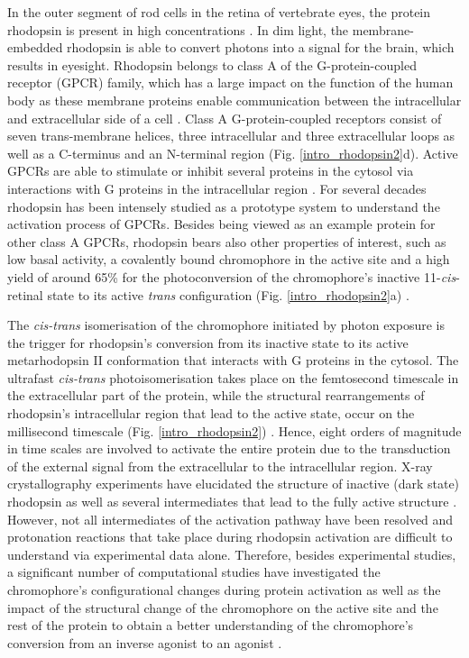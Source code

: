 \documentclass[journal=jacsat,manuscript=article]{achemso}
\begin{document}
In the outer segment of rod cells in the retina of vertebrate eyes,
the protein rhodopsin is present in high concentrations
\cite{liang2003organization}. In dim light, the membrane-embedded
rhodopsin is able to convert photons into a signal for the brain,
which results in eyesight. Rhodopsin belongs to class A of the
G-protein-coupled receptor (GPCR) family, which has a large impact on
the function of the human body as these membrane proteins enable
communication between the intracellular and extracellular side of a
cell \cite{lagerstrom2008structural}. Class A G-protein-coupled
receptors consist of seven trans-membrane helices, three intracellular
and three extracellular loops as well as a C-terminus and an
N-terminal region (Fig. \ref{intro_rhodopsin2}d). Active GPCRs are
able to stimulate or inhibit several proteins in the cytosol via
interactions with G proteins in the intracellular region
\cite{ritter2009fine}. For several decades rhodopsin has been
intensely studied as a prototype system to understand the activation
process of GPCRs. Besides being viewed as an example protein for other
class A GPCRs, rhodopsin bears also other properties of interest, such
as low basal activity, a covalently bound chromophore in the active
site and a high yield of around 65\% for the photoconversion of the
chromophore's inactive 11-\emph{cis}-retinal state to its active
\emph{trans} configuration (Fig. \ref{intro_rhodopsin2}a)
\cite{kim2001wavelength}.



The \emph{cis-trans} isomerisation of the chromophore initiated by
photon exposure is the trigger for rhodopsin's conversion from its
inactive state to its active metarhodopsin II conformation that
interacts with G proteins in the cytosol. The ultrafast
\emph{cis-trans} photoisomerisation takes place on the femtosecond
timescale in the extracellular part of the protein, while the
structural rearrangements of rhodopsin's intracellular region that
lead to the active state, occur on the millisecond timescale
(Fig. \ref{intro_rhodopsin2})
\cite{pan2001chromophore,jager1997chromophore,jager1997time,ganter1988rhodopsin,struts2011retinal}. Hence,
eight orders of magnitude in time scales are involved to activate the
entire protein due to the transduction of the external signal from the
extracellular to the intracellular region. X-ray crystallography
experiments have elucidated the structure of inactive (dark state)
rhodopsin as well as several intermediates that lead to the fully
active structure
\cite{li2004structure,choe2011crystal,okada2004retinal,salom2006crystal,deupi2012stabilized,xraybatho}. However,
not all intermediates of the activation pathway have been resolved and
protonation reactions that take place during rhodopsin activation are
difficult to understand via experimental data alone. Therefore,
besides experimental studies, a significant number of computational
studies have investigated the chromophore's configurational changes
during protein activation as well as the impact of the structural
change of the chromophore on the active site and the rest of the
protein to obtain a better understanding of the chromophore's
conversion from an inverse agonist to an agonist
\cite{altun2008mechanism,mertz2011steric,saam2002molecular,hornak2010light,neri2010role,rohrig2005solvent}.
\end{document}
